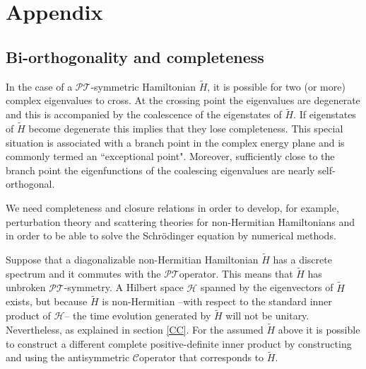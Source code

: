 \documentclass[12pt, a4paper]{report}
\newcommand\PT{\(\mathcal{PT}\)}
\newcommand\CC{\(\mathcal{C}\)}
\begin{document}
\chapter{Appendix}\label{appendix}
\section{Bi-orthogonality and completeness}\label{Biorthogonal}
In the case of a \PT-symmetric Hamiltonian $\tilde{H}$, it is possible for two (or more) complex eigenvalues to cross. At the crossing point the eigenvalues are degenerate and this is accompanied by the coalescence of the eigenstates of $\tilde{H}$. If eigenstates of $\tilde{H}$ become degenerate this implies that they lose completeness\cite{Brody_2013}. This special situation is associated with a branch point in the complex energy plane and is commonly termed an ``exceptional point"\cite{Moiseyev}. Moreover, sufficiently close to the branch point the eigenfunctions of the coalescing eigenvalues are nearly self-orthogonal.

We need completeness and closure relations in order to develop, for example, perturbation theory and scattering theories for non-Hermitian Hamiltonians and in order to be able to solve the Schrödinger equation by numerical methods\cite{Moiseyev}.

Suppose that a diagonalizable non-Hermitian Hamiltonian $\tilde{H}$ has a discrete spectrum and it commutes with the \PT\:operator. This means that  $\tilde{H}$ has unbroken \PT-symmetry. A Hilbert space $\mathcal{H}$ spanned by the eigenvectors of $\tilde{H}$ exists, but because $\tilde{H}$ is non-Hermitian --with respect to the standard inner product of $\mathcal{H}$-- the time evolution generated by $\tilde{H}$ will not be unitary\cite{Mostafazadeh}. Nevertheless, as explained in section \ref{CC}. For the assumed $\tilde{H}$ above it is possible to construct a different complete positive-definite inner product by constructing and using the antisymmetric \CC\:operator that corresponds to $\tilde{H}$.
\end{document}
